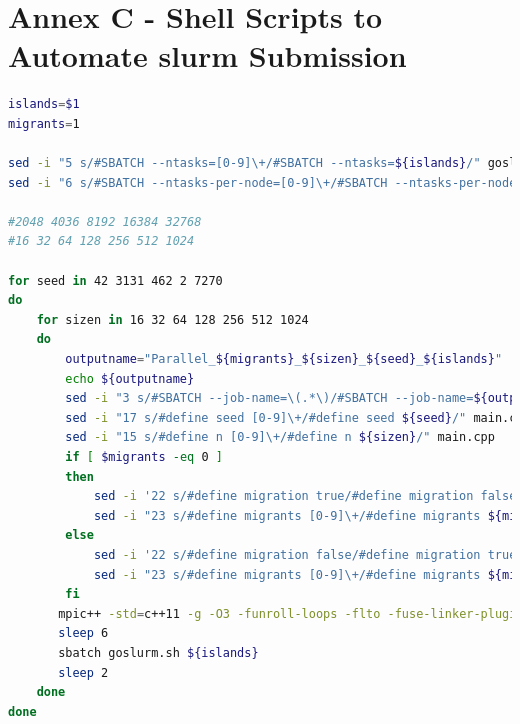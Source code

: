 \documentclass{report}
\begin{document}
\newpage
\section*{Annex C - Shell Scripts to Automate slurm Submission}
\begin{lstlisting}[language=bash]
islands=$1
migrants=1

sed -i "5 s/#SBATCH --ntasks=[0-9]\+/#SBATCH --ntasks=${islands}/" goslurm.sh
sed -i "6 s/#SBATCH --ntasks-per-node=[0-9]\+/#SBATCH --ntasks-per-node=${islands}/" goslurm.sh

#2048 4036 8192 16384 32768
#16 32 64 128 256 512 1024

for seed in 42 3131 462 2 7270
do
    for sizen in 16 32 64 128 256 512 1024
    do
        outputname="Parallel_${migrants}_${sizen}_${seed}_${islands}"
        echo ${outputname}
        sed -i "3 s/#SBATCH --job-name=\(.*\)/#SBATCH --job-name=${outputname}/" goslurm.sh
        sed -i "17 s/#define seed [0-9]\+/#define seed ${seed}/" main.cpp
        sed -i "15 s/#define n [0-9]\+/#define n ${sizen}/" main.cpp
        if [ $migrants -eq 0 ]
        then 
            sed -i '22 s/#define migration true/#define migration false/' main.cpp
            sed -i "23 s/#define migrants [0-9]\+/#define migrants ${migrants}/" main.cpp
        else
            sed -i '22 s/#define migration false/#define migration true/' main.cpp 
            sed -i "23 s/#define migrants [0-9]\+/#define migrants ${migrants}/" main.cpp 
        fi
       mpic++ -std=c++11 -g -O3 -funroll-loops -flto -fuse-linker-plugin functions.cpp main.cpp -o ${outputname}
       sleep 6
       sbatch goslurm.sh ${islands} 
       sleep 2
    done
done
\end{lstlisting}
\end{document}

